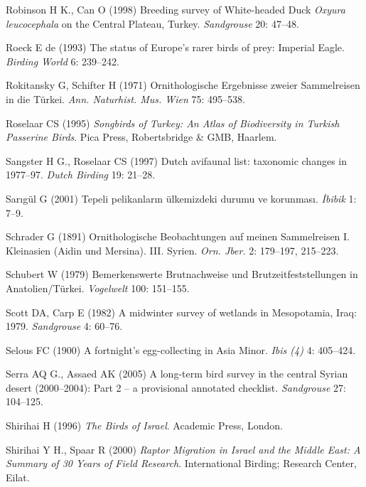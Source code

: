 \documentclass[
  letterpaper,
  DIV=11,
  numbers=noendperiod]{scrreprt}
\newlength{\cslhangindent}
\newenvironment{CSLReferences}[2] %
 {\begin{list}{}{%
  \setlength{\itemindent}{0pt}
  \setlength{\leftmargin}{0pt}
  \setlength{\parsep}{0pt}
  \ifodd #1
   \setlength{\leftmargin}{\cslhangindent}
   \setlength{\itemindent}{-1\cslhangindent}
  \fi
  \setlength{\itemsep}{#2\baselineskip}}}
 {\end{list}}
\begin{document}
\begin{CSLReferences}{0}{1}
Robinson H K., Can O (1998) {Breeding survey of White-headed Duck
\emph{Oxyura leucocephala} on the Central Plateau, Turkey}.
\emph{Sandgrouse} 20: 47--48.

Roeck E de (1993) {The status of Europe's rarer birds of prey: Imperial
Eagle}. \emph{Birding World} 6: 239--242.

Rokitansky G, Schifter H (1971) {Ornithologische Ergebnisse zweier
Sammelreisen in die Türkei}. \emph{Ann. Naturhist. Mus. Wien} 75:
495--538.

Roselaar CS (1995) \emph{{Songbirds of Turkey: An Atlas of Biodiversity
in Turkish Passerine Birds}}. Pica Press, Robertsbridge \& GMB, Haarlem.

Sangster H G., Roselaar CS (1997) {Dutch avifaunal list: taxonomic
changes in 1977--97}. \emph{Dutch Birding} 19: 21--28.

Sarıgül G (2001) {Tepeli pelikanların ülkemizdeki durumu ve korunması}.
\emph{İbibik} 1: 7--9.

Schrader G (1891) {Ornithologische Beobachtungen auf meinen Sammelreisen
I. Kleinasien (Aidin und Mersina). III. Syrien}. \emph{Orn. Jber.} 2:
179--197, 215--223.

Schubert W (1979) {Bemerkenswerte Brutnachweise und
Brutzeitfeststellungen in Anatolien/Türkei}. \emph{Vogelwelt} 100:
151--155.

Scott DA, Carp E (1982) {A midwinter survey of wetlands in Mesopotamia,
Iraq: 1979}. \emph{Sandgrouse} 4: 60--76.

Selous FC (1900) {A fortnight's egg-collecting in Asia Minor}.
\emph{Ibis (4)} 4: 405--424.

Serra AQ G., Assaed AK (2005) {A long-term bird survey in the central
Syrian desert (2000--2004): Part 2 -- a provisional annotated
checklist}. \emph{Sandgrouse} 27: 104--125.

Shirihai H (1996) \emph{{The Birds of Israel}}. Academic Press, London.

Shirihai Y H., Spaar R (2000) \emph{{Raptor Migration in Israel and the
Middle East: A Summary of 30 Years of Field Research}}. International
Birding; Research Center, Eilat.


\end{CSLReferences}
\end{document}
